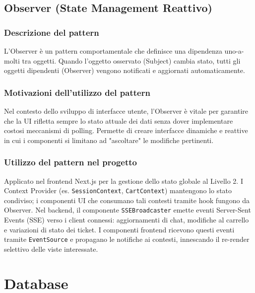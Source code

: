 \documentclass[a4paper, 11pt, oneside]{scrartcl}
\begin{document}
\subsection{Observer (State Management Reattivo)}

\subsubsection{Descrizione del pattern}
L'Observer è un pattern comportamentale che definisce una dipendenza uno-a-molti tra oggetti. Quando l'oggetto osservato (Subject) cambia stato, tutti gli oggetti dipendenti (Observer) vengono notificati e aggiornati automaticamente.

\subsubsection{Motivazioni dell'utilizzo del pattern}
Nel contesto dello sviluppo di interfacce utente, l'Observer è vitale per garantire che la UI rifletta sempre lo stato attuale dei dati senza dover implementare costosi meccanismi di polling. Permette di creare interfacce dinamiche e reattive in cui i componenti si limitano ad "ascoltare" le modifiche pertinenti.

\subsubsection{Utilizzo del pattern nel progetto}
Applicato nel frontend Next.js per la gestione dello stato globale al Livello 2. I Context Provider (es. \texttt{SessionContext}, \texttt{CartContext}) mantengono lo stato condiviso; i componenti UI che consumano tali contesti tramite hook fungono da Observer. Nel backend, il componente \texttt{SSEBroadcaster} emette eventi Server-Sent Events (SSE) verso i client connessi: aggiornamenti di chat, modifiche al carrello e variazioni di stato dei ticket. I componenti frontend ricevono questi eventi tramite \texttt{EventSource} e propagano le notifiche ai contesti, innescando il re-render selettivo delle viste interessate.

\newpage
\section{Database}
\end{document}
